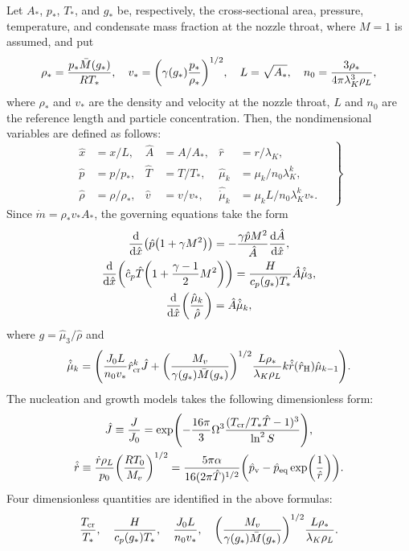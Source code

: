 \documentclass{article}
\newcommand{\vap}{\text{v}}
\newcommand{\eq}{\text{eq}}
\newcommand{\crit}[2][]{#2_\text{cr#1}}
\newcommand{\Hill}{\text{H}}
\begin{document}
Let $A_*$, $p_*$, $T_*$, and $g_*$ be, respectively, the cross-sectional area, pressure, temperature,
and condensate mass fraction at the nozzle throat, where $M=1$ is assumed, and put
\begin{equation}\label{eq:reference}
    \rho_* = \frac{p_*\bar{M}(g_*)}{RT_*}, \quad
    v_* = \qty(\gamma(g_*)\frac{p_*}{\rho_*})^{1/2}, \quad
    L = \sqrt{A_*}, \quad
    n_0 = \frac{3\rho_*}{4\pi\lambda_K^3\rho_L},
\end{equation}
where $\rho_*$ and $v_*$ are the density and velocity at the nozzle throat,
$L$ and $n_0$ are the reference length and particle concentration.
Then, the nondimensional variables are defined as follows:
\begin{equation}\label{eq:nondimensional}
    \left.\begin{aligned}
        \hat{x} &= x/L,             &\hat{A} &= A/A_*,  &\hat{r} &= r/\lambda_K, \\
        \hat{p} &= p/p_*,           &\hat{T} &= T/T_*,  &\hat{\mu}_k &= \mu_k/n_0\lambda_K^k, \\
        \hat{\rho} &= \rho/\rho_*,  &\hat{v} &= v/v_*,  &\hat{\dot{\mu}}_k &= \mu_kL/n_0\lambda_K^kv_*.
    \end{aligned}\quad\right\}
\end{equation}
Since $\dot{m} = \rho_*v_*A_*$, the governing equations take the form
\begin{gather}
    \dv{\hat{x}}(\hat{p}\qty(1 + \gamma M^2))
        = -\frac{\gamma \hat{p} M^2}{\hat{A}}\dv{\hat{A}}{\hat{x}}, \label{eq:momentum3}\\
    \dv{\hat{x}}(\hat{c}_p\hat{T}\qty(1 + \frac{\gamma-1}{2}M^2))
        = \frac{H}{c_p(g_*)T_*}\hat{A}\hat{\dot{\mu}}_3, \label{eq:energy3}\\
    \dv{\hat{x}}(\frac{\hat{\mu}_k}{\hat{\rho}}) = \hat{A}\hat{\dot{\mu}}_k, \label{eq:moments3}
\end{gather}
where $g = \hat{\mu}_3/\hat{\rho}$ and
\begin{equation}\label{eq:dot_mu_k}
    \hat{\dot{\mu}}_k = \qty( \frac{J_0L}{n_0v_*} \crit{\hat{r}}^{k}\hat{J}
        + \qty(\frac{M_v}{\gamma(g_*)\bar{M}(g_*)})^{1/2}\frac{L\rho_*}{\lambda_K\rho_L}
            k\hat{\dot{r}}(\hat{r}_\Hill)\hat{\mu}_{k-1}).
\end{equation}
The nucleation and growth models takes the following dimensionless form:
\begin{gather}
    \hat{J} \equiv \frac{J}{J_0}
        = \exp(-\frac{16\pi}{3}\Omega^3\frac{(\crit{T}/T_*\hat{T}-1)^3}{\ln^2{S}}), \label{eq:nucleation3}\\
    \hat{\dot{r}} \equiv \frac{\dot{r}\rho_L}{p_0}\qty(\frac{RT_0}{M_v})^{1/2}
        = \frac{5\pi\alpha}{16(2\pi\hat{T})^{1/2}}
            \qty(\hat{p}_\vap - \hat{p}_\eq\exp(\frac1{\hat{r}})). \label{eq:growth3}
\end{gather}
Four dimensionless quantities are identified in the above formulas:
\begin{equation}\label{eq:dimensionless}
    \frac{\crit{T}}{T_*}, \quad \frac{H}{c_p(g_*)T_*}, \quad
    \frac{J_0L}{n_0v_*}, \quad \qty(\frac{M_v}{\gamma(g_*)\bar{M}(g_*)})^{1/2}\frac{L\rho_*}{\lambda_K\rho_L}.
\end{equation}
\end{document}
